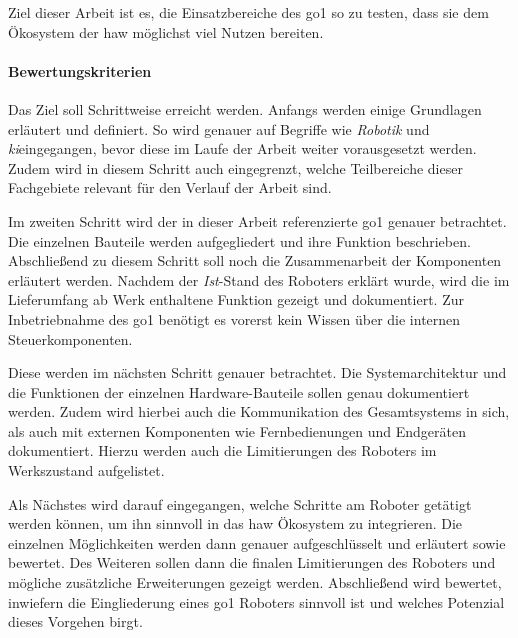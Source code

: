Ziel dieser Arbeit ist es, die Einsatzbereiche des \gls{go1} so zu testen, dass sie dem Ökosystem der \gls{haw} möglichst viel Nutzen bereiten.
\paragraph{Bewertungskriterien}


Das Ziel soll Schrittweise erreicht werden.
Anfangs werden einige Grundlagen erläutert und definiert.
So wird genauer auf Begriffe wie \emph{Robotik} und \emph{\gls{ki}}eingegangen, bevor diese im Laufe der Arbeit
weiter vorausgesetzt werden.
Zudem wird in diesem Schritt auch eingegrenzt, welche Teilbereiche dieser Fachgebiete relevant für den Verlauf der Arbeit sind.

Im zweiten Schritt wird der in dieser Arbeit referenzierte \gls{go1} genauer betrachtet.
Die einzelnen Bauteile werden aufgegliedert und ihre Funktion beschrieben.
Abschließend zu diesem Schritt soll noch die Zusammenarbeit der Komponenten erläutert werden.
Nachdem der \emph{Ist}-Stand des Roboters erklärt wurde, wird die im Lieferumfang ab Werk enthaltene Funktion gezeigt und dokumentiert.
Zur Inbetriebnahme des \gls{go1} benötigt es vorerst kein Wissen über die internen Steuerkomponenten.

Diese werden im nächsten Schritt genauer betrachtet.
Die Systemarchitektur und die Funktionen der einzelnen Hardware-Bauteile sollen genau dokumentiert werden.
Zudem wird hierbei auch die Kommunikation des Gesamtsystems in sich, als auch mit externen Komponenten wie Fernbedienungen
und Endgeräten dokumentiert.
Hierzu werden auch die Limitierungen des Roboters im Werkszustand aufgelistet.

Als Nächstes wird darauf eingegangen, welche Schritte am Roboter getätigt werden können, um ihn sinnvoll
in das \gls{haw} Ökosystem zu integrieren.
Die einzelnen Möglichkeiten werden dann genauer aufgeschlüsselt und erläutert sowie bewertet.
Des Weiteren sollen dann die finalen Limitierungen des Roboters und mögliche zusätzliche Erweiterungen gezeigt werden.
Abschließend wird bewertet, inwiefern die Eingliederung eines \gls{go1} Roboters sinnvoll ist und welches Potenzial dieses Vorgehen birgt.

